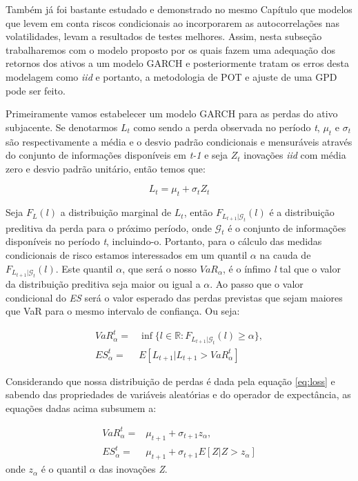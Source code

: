 \documentclass[review]{elsarticle}
\theoremstyle{definition}
\begin{document}
Também já foi bastante estudado e demonstrado no mesmo Capítulo  que modelos que levem em conta riscos condicionais ao incorporarem as autocorrelações nas volatilidades, levam a resultados de testes melhores. Assim, nesta subseção trabalharemos com o modelo proposto por \cite{McNeil2000} os quais fazem uma adequação dos retornos dos ativos a um modelo GARCH e posteriormente tratam os erros desta modelagem como \emph{iid} e portanto, a metodologia de POT e ajuste de uma GPD pode ser feito.

Primeiramente vamos estabelecer um modelo GARCH para as perdas do ativo subjacente. Se denotarmos $L_t$ como sendo a perda observada no período \emph{t}, $\mu_t$ e $\sigma_t$ são respectivamente a média e o desvio padrão condicionais e mensuráveis através do conjunto de informações disponíveis em \emph{t-1} e seja $Z_t$ inovações \emph{iid} com média zero e desvio padrão unitário, então temos que:

\begin{equation}
\label{eq:loss}
L_t=\mu_t+\sigma_t Z_t
\end{equation}

Seja $F_L(l)$ a distribuição marginal de $L_t$, então $F_{L_{t+1} | \mathcal{G}_t}(l)$ é a distribuição preditiva da perda para o próximo período, onde $\mathcal{G}_t$ é o conjunto de informações disponíveis no período \emph{t}, incluindo-o. Portanto, para o cálculo das medidas condicionais de risco estamos interessados em um quantil $\alpha$ na cauda de $F_{L_{t+1} | \mathcal{G}_t}(l)$. Este quantil $\alpha$, que será o nosso $VaR_\alpha$, é o ínfimo \emph{l} tal que o valor da distribuição preditiva seja maior ou igual a $\alpha$. Ao passo que o valor condicional do \emph{ES} será o valor esperado das perdas previstas que sejam maiores que VaR para o mesmo intervalo de confiança. Ou seja:

\begin{align}
VaR_\alpha^t=&\inf\{l \in \mathbb{R}: F_{L_{t+1} | \mathcal{G}_t}(l) \geq \alpha\}, \\
ES_\alpha^t=&E[L_{t+1} | L_{t+1} > VaR_\alpha^t]
\end{align}

Considerando que nossa distribuição de perdas é dada pela equação \eqref{eq:loss} e sabendo das propriedades de variáveis aleatórias e do operador de expectância, as equações dadas acima subsumem a:

\begin{align}
VaR_\alpha^t=&\mu_{t+1}+\sigma_{t+1}z_\alpha, \label{eq:varcond} \\
ES_\alpha^t=&\mu_{t+1}+\sigma_{t+1}E[Z | Z>z_\alpha] \label{eq:escond}
\end{align}
onde $z_\alpha$ é o quantil $\alpha$ das inovações \emph{Z}.
\end{document}
